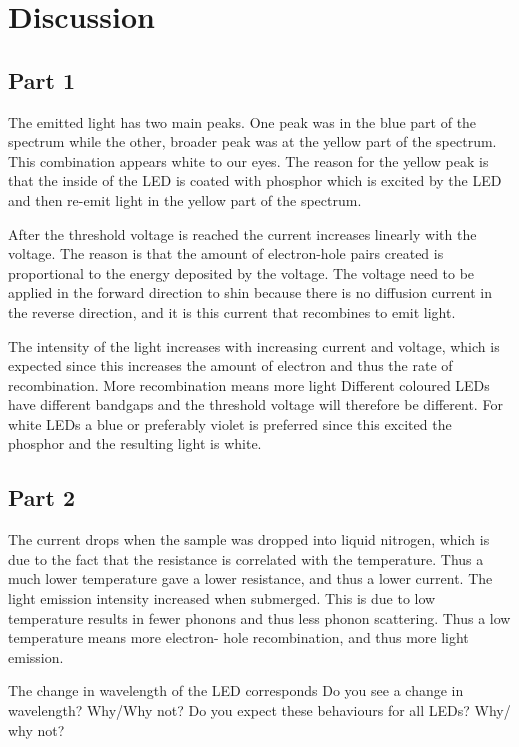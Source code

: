 \section{Discussion}
\subsection{Part 1}
The emitted light has two main peaks. One peak was in the blue part of the spectrum while the other, broader peak was at the yellow part of the spectrum. This combination appears white to our eyes. The reason for the yellow peak is that the inside of the LED is coated with phosphor which is excited by the LED and then re-emit light in the yellow part of the spectrum.

After the threshold voltage is reached the current increases linearly with the voltage. The reason is that the amount of electron-hole pairs created is proportional to the energy deposited by the voltage. The voltage need to be applied in the forward direction to shin because there is no diffusion current in the reverse direction, and it is this current that recombines to emit light.

The intensity of the light increases with increasing current and voltage, which is expected since this increases the amount of electron and thus the rate of recombination. More recombination means more light Different coloured LEDs have different bandgaps and the threshold voltage will therefore be different. For white LEDs a blue or preferably violet is preferred since this excited the phosphor and the resulting light is white.

\subsection{Part 2}
The current drops when the sample was dropped into liquid nitrogen, which is due to the fact that the resistance is correlated with the temperature. Thus a much lower temperature gave a lower resistance, and thus a lower current. The light emission intensity increased when submerged. This is due to low temperature results in fewer phonons and thus less phonon scattering. Thus a low temperature means more electron- hole recombination, and thus more light emission. 

The change in wavelength of the LED corresponds 
Do you see a change in wavelength? Why/Why not?
Do you expect these behaviours for all LEDs? Why/ why not?


